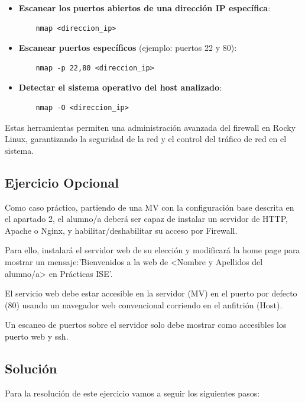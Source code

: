 \begin{itemize}
    \item \textbf{Escanear los puertos abiertos de una dirección IP específica}:
    \begin{verbatim}
    nmap <direccion_ip>
    \end{verbatim}

    \item \textbf{Escanear puertos específicos} (ejemplo: puertos 22 y 80):
    \begin{verbatim}
    nmap -p 22,80 <direccion_ip>
    \end{verbatim}

    \item \textbf{Detectar el sistema operativo del host analizado}:
    \begin{verbatim}
    nmap -O <direccion_ip>
    \end{verbatim}
\end{itemize}

Estas herramientas permiten una administración avanzada del firewall en Rocky Linux, garantizando la seguridad de la red y el control del tráfico de red en el sistema.

\subsection{Ejercicio Opcional}

Como caso práctico, partiendo de una MV con la configuración base descrita en el apartado 2, el
alumno/a deberá ser capaz de instalar un servidor de HTTP, Apache o Nginx,
y habilitar/deshabilitar su acceso por Firewall.

Para ello, instalará el servidor web de su elección y modificará la home page para mostrar un
mensaje:'Bienvenidos a la web de <Nombre y Apellidos del alumno/a> en Prácticas ISE'.

El servicio web debe estar accesible en la servidor (MV) en el puerto por defecto (80) usando un
navegador web convencional corriendo en el anfitrión (Host).

Un escaneo de puertos sobre el servidor solo debe mostrar como accesibles los puerto web y ssh.

\subsection*{Solución}

Para la resolución de este ejercicio vamos a seguir los siguientes pasos:

